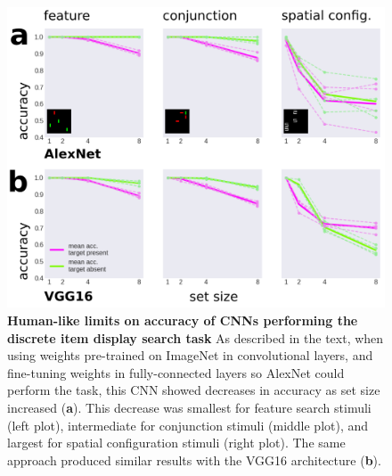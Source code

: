 \documentclass[10pt,letterpaper]{article}
\begin{document}
\begin{figure}[!ht]
\begin{center}
\includegraphics[width=\columnwidth]{fig2/fig2.png}
\end{center}
\caption{
\textbf{Human-like limits on accuracy of CNNs performing the discrete item display search task}
As described in the text, when using weights pre-trained on ImageNet in convolutional layers, 
and fine-tuning weights in fully-connected layers so AlexNet could perform the task, 
this CNN showed decreases in accuracy as set size increased (\textbf{a}). This decrease was 
smallest for feature search stimuli (left plot), intermediate for conjunction stimuli (middle plot), 
and largest for spatial configuration stimuli (right plot). The same approach produced similar 
results with the VGG16 architecture (\textbf{b}).
} 
\label{fig2}
\end{figure}
\end{document}
